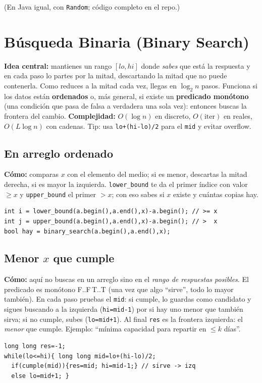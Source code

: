 \documentclass[10pt,a4paper,twocolumn]{article}
\begin{document}
(En Java igual, con \texttt{Random}; código completo en el repo.)

\section{Búsqueda Binaria (Binary Search)}
\textbf{Idea central:} mantienes un rango $[lo,hi]$ donde \emph{sabes}
que está la respuesta y en cada paso lo partes por la mitad, descartando
la mitad que no puede contenerla. Como reduces a la mitad cada vez,
llegas en $\log_2 n$ pasos. Funciona si los datos están \textbf{ordenados}
o, más general, si existe un \textbf{predicado monótono} (una condición
que pasa de falsa a verdadera una sola vez): entonces buscas la frontera
del cambio. \textbf{Complejidad:} $O(\log n)$ en discreto,
$O(\text{iter})$ en reales, $O(L\log n)$ con cadenas. Tip: usa
\texttt{lo+(hi-lo)/2} para el \texttt{mid} y evitar overflow.

\subsection{En arreglo ordenado}
\textbf{Cómo:} comparas $x$ con el elemento del medio; si es menor,
descartas la mitad derecha, si es mayor la izquierda. \texttt{lower\_bound}
te da el primer índice con valor $\geq x$ y \texttt{upper\_bound} el
primer $> x$; con eso sabes si $x$ existe y cuántas copias hay.
\begin{lstlisting}[style=cpp]
int i = lower_bound(a.begin(),a.end(),x)-a.begin(); // >= x
int j = upper_bound(a.begin(),a.end(),x)-a.begin(); // >  x
bool hay = binary_search(a.begin(),a.end(),x);
\end{lstlisting}


\subsection{Menor $x$ que cumple}
\textbf{Cómo:} aquí no buscas en un arreglo sino en el \emph{rango de
respuestas posibles}. El predicado es monótono F..F\,T..T (una vez que
algo ``sirve'', todo lo mayor también). En cada paso pruebas el
\texttt{mid}: si cumple, lo guardas como candidato y sigues buscando a la
izquierda (\texttt{hi=mid-1}) por si hay uno menor que también sirva; si
no cumple, subes (\texttt{lo=mid+1}). Al final \texttt{res} es la
frontera izquierda: el \emph{menor} que cumple. Ejemplo: ``mínima
capacidad para repartir en $\leq k$ días''.
\begin{lstlisting}[style=cpp]
long long res=-1;
while(lo<=hi){ long long mid=lo+(hi-lo)/2;
  if(cumple(mid)){res=mid; hi=mid-1;} // sirve -> izq
  else lo=mid+1; }
\end{lstlisting}
\end{document}
